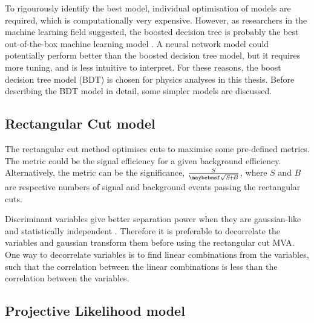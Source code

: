 To rigourously identify the best model, individual optimisation of models are required, which is computationally very expensive. However, as researchers in the machine learning field suggested, the boosted decision tree is probably the best out-of-the-box machine learning model  \cite{hastie2009elements}. A neural network model could potentially perform better than the boosted decision tree model, but it requires more tuning, and is less intuitive to interpret. For these reasons, the boost decision tree model (BDT) is chosen for physics analyses in this thesis. Before describing the BDT model in detail, some simpler models are discussed.

\subsection{Rectangular Cut model}


The rectangular cut method optimises cuts to maximise some pre-defined metrics. The metric could be the signal efficiency for a given background efficiency. Alternatively, the metric can be the significance, $\frac{S}{\rootOf{S\!+\!B}}$, where $S$ and $B$ are respective numbers of  signal and background events passing the rectangular cuts.

Discriminant variables give better separation power when they are gaussian-like and statistically independent \cite{hastie2009elements}. Therefore it is preferable to decorrelate  the variables and gaussian transform them before using the rectangular cut MVA. One way to decorrelate variables is to find linear combinations from the variables, such that the correlation between the  linear combinations is less than the correlation between the variables.


\subsection{Projective Likelihood model}
\label{sec:pandoraLikelihood}

